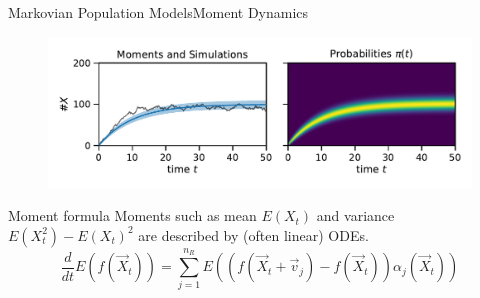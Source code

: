 \documentclass[10pt]{beamer}
\newcommand{\expSym}{{E}}
\newcommand{\E}[1]{\ensuremath{\expSym\left(#1\right)}}
\begin{document}
\begin{frame}{Markovian Population Models}{Moment Dynamics}
    \begin{figure}
        \centering
    \includegraphics[scale=.45]{../gfx/momsandprobs.pdf}
    \end{figure}
          \begin{block}{Moment formula}
              Moments such as mean $\E{X_t}$ and variance $\E{X_t^2}-\E{X_t}^2$ are described by (often {linear}) ODEs.
        \begin{equation*}
            \frac{d}{dt}\E{f({\vec{ X}}_t)} = \sum_{j=1}^{n_R}\E{\left(f({\vec X_t +
            \vec{v}_j}) - f(\vec X_t)\right)\alpha_j(\vec X_t)}
        \end{equation*}
          \end{block}
\end{frame}
\end{document}
